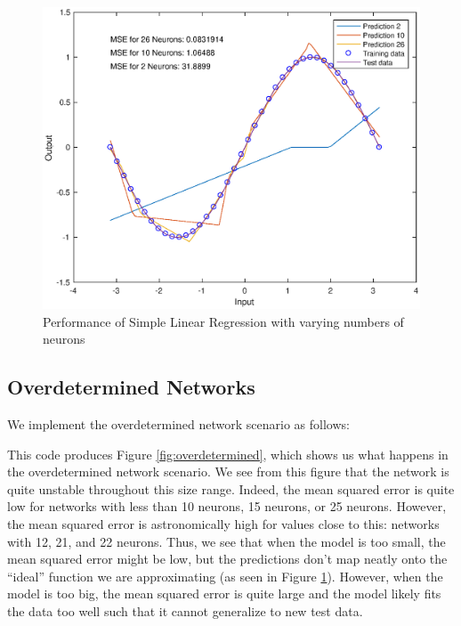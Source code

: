 \documentclass[11pt, oneside]{article}
\begin{document}
\begin{figure}[ht!]
\includegraphics[width=1\textwidth]{Q2PartA.eps}
\caption{Performance of Simple Linear Regression with varying numbers of neurons}
\label{fig:regression}
\end{figure}

\subsection{Overdetermined Networks}

We implement the overdetermined network scenario as follows:

This code produces Figure \ref{fig:overdetermined}, which shows us what happens in the overdetermined network scenario. We see from this figure that the network is quite unstable throughout this size range. Indeed, the mean squared error is quite low for networks with less than 10 neurons, 15 neurons, or 25 neurons. However, the mean squared error is astronomically high for values close to this: networks with 12, 21, and 22 neurons. Thus, we see that when the model is too small, the mean squared error might be low, but the predictions don't map neatly onto the ``ideal'' function we are approximating (as seen in Figure \ref{fig:regression}). However, when the model is too big, the mean squared error is quite large and the model likely fits the data too well such that it cannot generalize to new test data.
\end{document}
